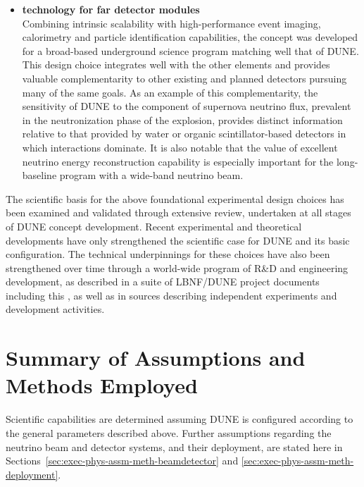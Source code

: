 \begin{itemize}
  \item {\bf \lartpc technology for far detector modules}\\
    Combining intrinsic scalability with high-performance event 
    imaging, calorimetry and particle identification capabilities, 
    the  concept was developed 
    for a broad-based underground science program matching well 
    that of DUNE.  This design choice integrates well with the
    other elements and provides valuable complementarity to other 
    existing and planned detectors pursuing many
    of the same goals.  As an example of this complementarity,
    the sensitivity of DUNE to the \nue component of supernova 
    neutrino flux, prevalent in the neutronization phase of the 
    explosion, provides distinct information relative to that 
    provided by water or organic scintillator-based detectors in 
    which \anue interactions dominate.  It is also notable that 
    the value of excellent neutrino energy reconstruction capability
    is especially important for the long-baseline program with a 
    wide-band neutrino beam.
\end{itemize}

The scientific basis for the above foundational experimental
design choices has been examined and validated through extensive
review, undertaken at all stages of DUNE concept development.
Recent experimental and theoretical developments have only
strengthened the scientific case for DUNE and its
basic configuration.  The technical underpinnings for
these choices have also been strengthened over time through a world-wide
program of R\&D and engineering development, as described in a suite
of LBNF/DUNE project documents including this , as
well as in sources describing independent experiments and development
activities.

\section{Summary of Assumptions and Methods Employed}
\label{sec:exec-phys-assm-meth}

Scientific capabilities are determined assuming DUNE
is configured according to the general parameters described above.
Further assumptions regarding the neutrino beam and detector 
systems, and their deployment, are stated here in
Sections~\ref{sec:exec-phys-assm-meth-beamdetector} and
\ref{sec:exec-phys-assm-meth-deployment}. 

